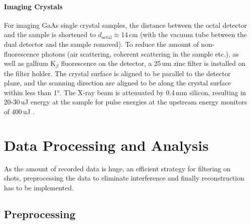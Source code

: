\paragraph{Imaging Crystals}
For imaging GaAs single crystal samples, the distance between the octal detector and the sample is shortened to $d_\text{octal}\approx$14\,cm (with the vacuum tube between the dual detector and the sample removed). To reduce the amount of non-fluorescence photons  (air scattering, coherent scattering in the sample etc.), as well as gallium K$_\beta$ fluorescence on the detector, a 25\,um zinc filter is installed on the filter holder. The crystal surface is aligned to be parallel to the detector plane, and the scanning direction are aligned to be along the crystal surface within less than 1°. The X-ray beam is attenuated by 0.4\,mm silicon, resulting in 20-30\,uJ  energy at the sample for pulse energies at the upstream energy monitors of 400\,uJ \cite{yabashi2015,tono2013}.

\section{Data Processing and Analysis}
As the amount of recorded data is huge, an efficient strategy for filtering on shots, preprocessing the data to eliminate interference and finally reconstruction has to be implemented.
\subsection{Preprocessing}









